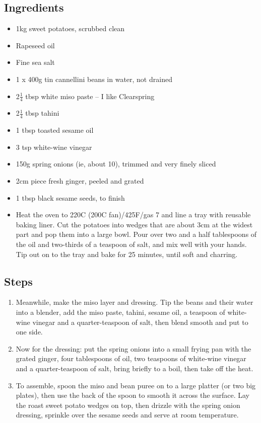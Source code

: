 \documentclass{book}
\begin{document}
\subsection*{Ingredients}
\begin{itemize}
\item 1kg sweet potatoes, scrubbed clean
\item Rapeseed oil
\item Fine sea salt
\item 1 x 400g tin cannellini beans in water, not drained
\item 2$\frac{1}{4}$ tbsp white miso paste – I like Clearspring
\item 2$\frac{1}{4}$ tbsp tahini
\item 1 tbsp toasted sesame oil
\item 3 tsp white-wine vinegar
\item 150g spring onions (ie, about 10), trimmed and very finely sliced
\item 2cm piece fresh ginger, peeled and grated
\item 1 tbsp black sesame seeds, to finish
\end{itemize}

\begin{itemize}
\item  Heat the oven to 220C (200C fan)/425F/gas 7 and line a tray with reusable baking liner. Cut the potatoes into wedges that are about 3cm at the widest part and pop them into a large bowl. Pour over two and a half tablespoons of the oil and two-thirds of a teaspoon of salt, and mix well with your hands. Tip out on to the tray and bake for 25 minutes, until soft and charring.
\end{itemize}

\subsection*{Steps}
\begin{enumerate}
\item Meanwhile, make the miso layer and dressing. Tip the beans and their water into a blender, add the miso paste, tahini, sesame oil, a teaspoon of white-wine vinegar and a quarter-teaspoon of salt, then blend smooth and put to one side.
\item Now for the dressing: put the spring onions into a small frying pan with the grated ginger, four tablespoons of oil, two teaspoons of white-wine vinegar and a quarter-teaspoon of salt, bring briefly to a boil, then take off the heat.
\item To assemble, spoon the miso and bean puree on to a large platter (or two big plates), then use the back of the spoon to smooth it across the surface. Lay the roast sweet potato wedges on top, then drizzle with the spring onion dressing, sprinkle over the sesame seeds and serve at room temperature.
\end{enumerate}
\newpage
\end{document}
